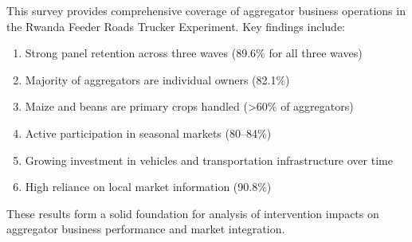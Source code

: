 \documentclass[11pt]{article}
\begin{document}
This survey provides comprehensive coverage of aggregator business operations in the Rwanda Feeder Roads Trucker Experiment. Key findings include:

\begin{enumerate}
    \item Strong panel retention across three waves (89.6\% for all three waves)
    \item Majority of aggregators are individual owners (82.1\%)
    \item Maize and beans are primary crops handled (>60\% of aggregators)
    \item Active participation in seasonal markets (80--84\%)
    \item Growing investment in vehicles and transportation infrastructure over time
    \item High reliance on local market information (90.8\%)
\end{enumerate}

These results form a solid foundation for analysis of intervention impacts on aggregator business performance and market integration.
\end{document}
